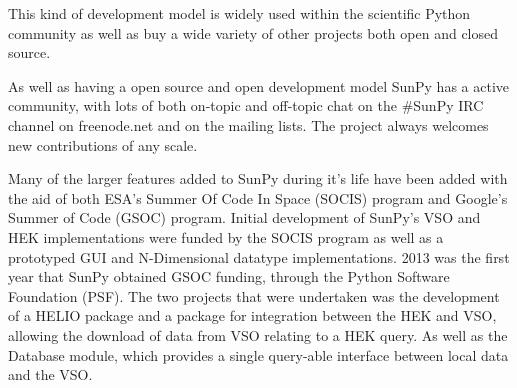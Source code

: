 This kind of development model is widely used within the scientific Python 
community as well as buy a wide variety of other projects both open and closed 
source.

As well as having a open source and open development model SunPy has a active 
community, with lots of both on-topic and off-topic chat on the \#SunPy IRC 
channel on freenode.net and on the mailing lists. The project always welcomes 
new contributions of any scale.

Many of the larger features added to SunPy during it's life have been added 
with the aid of both ESA's Summer Of Code In Space (SOCIS) program and Google's 
Summer of Code (GSOC) program. Initial development of SunPy's VSO and HEK 
implementations were funded by the SOCIS program as well as a prototyped GUI 
and N-Dimensional datatype implementations. 2013 was the first year that SunPy 
obtained GSOC funding, through the Python Software Foundation (PSF). The two 
projects that were undertaken was the development of a HELIO package and a 
package for integration between the HEK and VSO, allowing the download of data 
from VSO relating to a HEK query. As well as the Database module, which 
provides a single query-able interface between local data and the VSO.